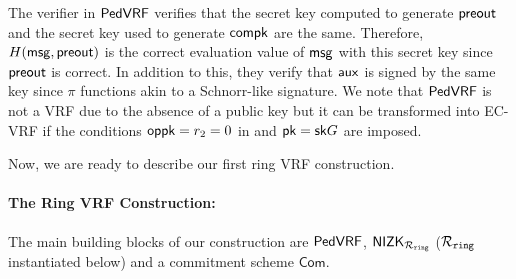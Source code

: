 %



The verifier in $ {\mathsf{PedVRF}} $ verifies that the secret key computed to generate $ {\mathsf{preout}} $ and the secret key used to generate $ \mathsf{compk} $ are the same. Therefore, $ H(\mathsf{msg}, {\mathsf{preout}}) $ is the correct evaluation value of $ \mathsf{msg} $ with this secret key since $ {\mathsf{preout}} $ is correct. In addition to this, they verify that $ \mathsf{aux} $
is signed by the same key since $ \pi $ functions akin to a  Schnorr-like signature. We note that $ {\mathsf{PedVRF}} $ is not a VRF due to the absence of a public key but it can be transformed into EC-VRF if the conditions $\mathsf{oppk} = r_2 = 0$ in \Sign and $ \mathsf{pk} = \mathsf{sk} G $ are imposed.

Now, we are ready to describe our first ring VRF construction.
\paragraph{The Ring VRF Construction:} The main building blocks of our construction are $ {\mathsf{PedVRF}} $, $ {\mathsf{NIZK}}_{\mathcal{R}_{\mathtt{ring}}} $ ($\mathcal{R}_{\mathtt{ring}}$ instantiated below) and a commitment scheme $ \mathsf{Com} $.

